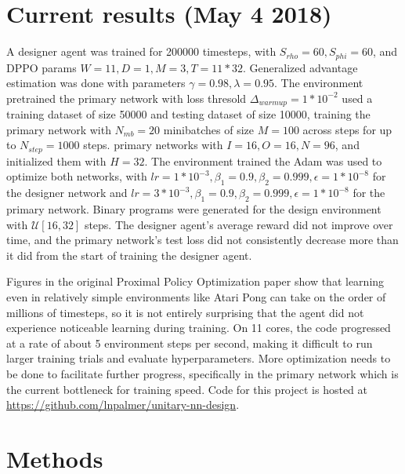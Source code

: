 \documentclass{article}[12px]
\begin{document}
\section{Current results (May 4 2018)}
A designer agent was trained for 200000 timesteps, with \(S_{rho} = 60, S_{phi} = 60\), and DPPO params \(W = 11, D = 1, M = 3, T = 11 * 32\). Generalized advantage estimation \cite{DBLP:journals/corr/SchulmanMLJA15} was done with parameters \(\gamma = 0.98, \lambda = 0.95\). The environment pretrained the primary network with loss thresold \(\Delta_{warmup} = 1*10^{-2}\) used a training dataset of size 50000 and testing dataset of size 10000, training the primary network with \(N_{mb} = 20\) minibatches of size \(M = 100\) across steps for up to \(N_{step} = 1000\) steps. primary networks with \(I = 16, O = 16, N = 96\), and initialized them with \(H = 32\). The environment trained the  Adam \cite{DBLP:journals/corr/KingmaB14} was used to optimize both networks, with \(lr = 1*10^{-3}, \beta_1 = 0.9, \beta_2 = 0.999, \epsilon = 1*10^{-8}\) for the designer network and \(lr = 3*10^{-3}, \beta_1 = 0.9, \beta_2 = 0.999, \epsilon = 1*10^{-8}\) for the primary network. Binary programs were generated for the design environment with \(\mathcal{U}[16, 32]\) steps. The designer agent's average reward did not improve over time, and the primary network's test loss did not consistently decrease more than it did from the start of training the designer agent.

Figures in the original Proximal Policy Optimization paper \cite{DBLP:journals/corr/SchulmanWDRK17} show that learning even in relatively simple environments like Atari Pong can take on the order of millions of timesteps, so it is not entirely surprising that the agent did not experience noticeable learning during training. On 11 cores, the code progressed at a rate of about 5 environment steps per second, making it difficult to run larger training trials and evaluate hyperparameters. More optimization needs to be done to facilitate further progress, specifically in the primary network which is the current bottleneck for training speed. Code for this project is hosted at \url{https://github.com/lnpalmer/unitary-nn-design}.

{}


\pagebreak

\appendix
\section{Methods}
\end{document}
